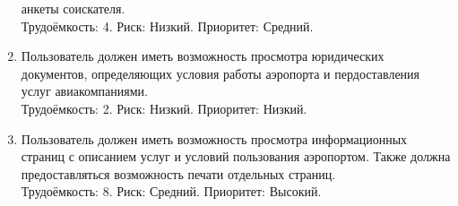 \begin{enumerate}
          анкеты соискателя. \\
          Трудоёмкость: 4. Риск: Низкий. Приоритет: Средний.
    \item Пользователь должен иметь возможность просмотра юридических 
          документов, определяющих условия работы аэропорта и пердоставления 
          услуг авиакомпаниями. \\
          Трудоёмкость: 2. Риск: Низкий. Приоритет: Низкий.
    \item Пользователь должен иметь возможность просмотра информационных 
          страниц с описанием услуг и условий пользования аэропортом. 
          Также должна предоставляться возможность печати отдельных страниц. \\
          Трудоёмкость: 8. Риск: Средний. Приоритет: Высокий.
\end{enumerate}

